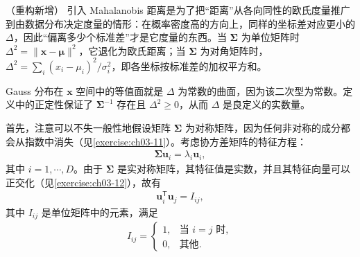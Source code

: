 \documentclass[../../main.tex]{subfiles}
\begin{document}
\begin{remark}（重构新增）
引入 Mahalanobis 距离是为了把“距离”从各向同性的欧氏度量推广到由数据分布决定度量的情形：在概率密度高的方向上，同样的坐标差对应更小的 $\Delta$，因此“偏离多少个标准差”才是它度量的东西。当 $\boldsymbol{\Sigma}$ 为单位矩阵时 $\Delta^{2}=\lVert\boldsymbol{x}-\boldsymbol{\mu}\rVert^{2}$，它退化为欧氏距离；当 $\boldsymbol{\Sigma}$ 为对角矩阵时，$\Delta^{2}=\sum_{i}(x_i-\mu_i)^{2}/\sigma_i^{2}$，即各坐标按标准差的加权平方和。

Gauss 分布在 $\boldsymbol{x}$ 空间中的等值面就是 $\Delta$ 为常数的曲面，因为该二次型为常数。定义中的正定性保证了 $\boldsymbol{\Sigma}^{-1}$ 存在且 $\Delta^{2}\geqslant0$，从而 $\Delta$ 是良定义的实数量。
\end{remark}

首先，注意可以不失一般性地假设矩阵 $\boldsymbol{\Sigma}$ 为对称矩阵，因为任何非对称的成分都会从指数中消失（见\cref{exercise:ch03-11}）。考虑协方差矩阵的特征方程：
\begin{align}
\boldsymbol{\Sigma}\boldsymbol{u}_{i}=\lambda_{i}\boldsymbol{u}_{i},
\label{align:ch03-特征方程}
\end{align}
其中 $i=1,\cdots,D$。由于 $\boldsymbol{\Sigma}$ 是实对称矩阵，其特征值是实数，并且其特征向量可以正交化（见\cref{exercise:ch03-12}），故有
\begin{align}
\boldsymbol{u}_{i}^{\mathsf{T}}\boldsymbol{u}_{j}=I_{ij},
\label{align:ch03-特征向量正交}
\end{align}
其中 $I_{ij}$ 是单位矩阵中的元素，满足
\begin{align}
I_{ij}=\begin{cases}1, & \text{当 } i=j \text{ 时},\\ 0, & \text{其他}.\end{cases}
\label{align:ch03-单位矩阵元素}
\end{align}
\end{document}
